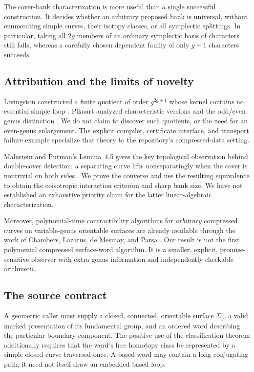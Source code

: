 \documentclass[11pt,letterpaper]{article}
\theoremstyle{definition}
\theoremstyle{remark}
\begin{document}
The cover-bank characterization is more useful than a single successful construction. It decides whether an arbitrary proposed bank is universal, without enumerating simple curves, their isotopy classes, or all symplectic splittings. In particular, taking all $2g$ members of an ordinary symplectic basis of characters still fails, whereas a carefully chosen dependent family of only $g+1$ characters succeeds.

\subsection{Attribution and the limits of novelty}
Livingston constructed a finite quotient of order $g^{2g+1}$ whose kernel contains no essential simple loop \cite{livingston}. Pikaart analyzed characteristic versions and the odd/even genus distinction \cite{pikaart}. We do not claim to discover such quotients, or the need for an even-genus enlargement. The explicit compiler, certificate interface, and transport failure example specialize that theory to the repository's compressed-data setting.

Malestein and Putman's Lemma~4.5 gives the key topological observation behind double-cover detection: a separating curve lifts nonseparatingly when the cover is nontrivial on both sides \cite{mp}. We prove the converse and use the resulting equivalence to obtain the coisotropic interaction criterion and sharp bank size. We have not established an exhaustive priority claim for the latter linear-algebraic characterization.

Moreover, polynomial-time contractibility algorithms for \emph{arbitrary} compressed curves on variable-genus orientable surfaces are already available through the work of Chambers, Lazarus, de Mesmay, and Parsa \cite{clmp}. Our result is not the first polynomial compressed surface-word algorithm. It is a smaller, explicit, promise-sensitive observer with extra genus information and independently checkable arithmetic.

\subsection{The source contract}
A geometric caller must supply a closed, connected, orientable surface $\Sigma_g$, a valid marked presentation of its fundamental group, and an ordered word describing the particular boundary component. The positive use of the classification theorem additionally requires that the word's free homotopy class be represented by a simple closed curve traversed once. A based word may contain a long conjugating path; it need not itself draw an embedded based loop.
\end{document}
